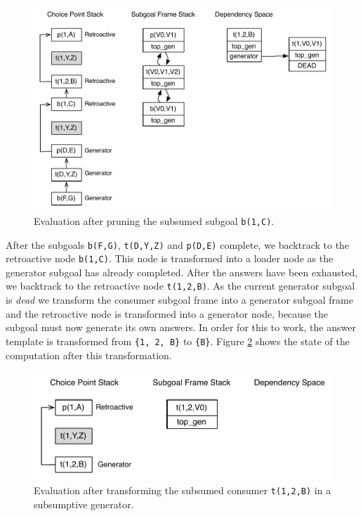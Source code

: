 \begin{figure}[ht]
  \centering
    \includegraphics[scale=0.5]{retro_sub3.pdf}
  \caption{Evaluation after pruning the subsumed subgoal \texttt{b(1,C)}.}
  \label{fig:retro_sub3}
\end{figure}

After the subgoals \texttt{b(F,G)}, \texttt{t(D,Y,Z)} and \texttt{p(D,E)} complete, we backtrack to
the retroactive node \texttt{b(1,C)}. This node is transformed into a loader node as the generator
subgoal has already completed. After the answers have been exhausted, we backtrack to the retroactive
node \texttt{t(1,2,B)}. As the current generator subgoal is \textit{dead} we transform the consumer subgoal
frame into a generator subgoal frame and the retroactive node is transformed into a generator node, because
the subgoal must now generate its own answers. In order for this to work, the answer template is transformed
from \texttt{\{1,~2,~B\}} to \texttt{\{B\}}. Figure \ref{fig:retro_sub4} shows the state of the computation
after this transformation.

\begin{figure}[ht]
  \centering
    \includegraphics[scale=0.5]{retro_sub4.pdf}
  \caption{Evaluation after transforming the subsumed consumer \texttt{t(1,2,B)} in a subsumptive generator.}
  \label{fig:retro_sub4}
\end{figure}

